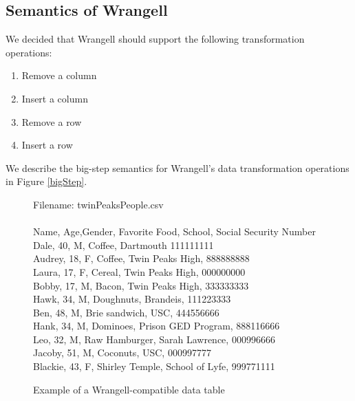 \documentclass[preprint,nocopyrightspace]{sig-alternate}
\begin{document}
\subsection{Semantics of Wrangell}
We decided that Wrangell should support the following transformation operations:
\begin{enumerate}
\item Remove a column
\item Insert a column
\item Remove a row
\item Insert a row
\end{enumerate}

We describe the big-step semantics for Wrangell's data transformation operations in Figure \ref{bigStep}.

\onecolumn

\begin{figure}
\caption{Example of a Wrangell-compatible data table}
Filename: twinPeaksPeople.csv
\\\\
Name,   Age,Gender,	Favorite Food,	School,				Social Security Number \\
Dale,   40,	M,		Coffee,			Dartmouth			111111111\\
Audrey, 18,	F,		Coffee,			Twin Peaks High,	888888888\\
Laura,  17,	F,		Cereal,			Twin Peaks High,	000000000\\
Bobby,  17,	M,		Bacon,			Twin Peaks High,	333333333\\
Hawk,   34,	M,		Doughnuts,		Brandeis,			111223333\\
Ben,    48,	M,		Brie sandwich,	USC,				444556666\\
Hank,   34,	M,		Dominoes,		Prison GED Program,	888116666\\
Leo,    32,	M,		Raw Hamburger,	Sarah Lawrence,		000996666\\
Jacoby,  51, M,		Coconuts,		USC,				000997777\\
Blackie,	43, F,	Shirley Temple,	School of Lyfe,		999771111\\	
\label{exampleTable}	
\end{figure} 
\end{document}
